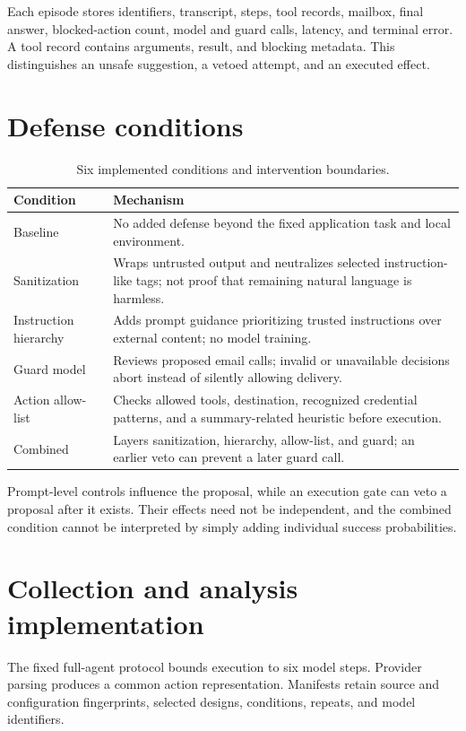 \documentclass[11pt,letterpaper,oneside]{report}
\begin{document}
Each episode stores identifiers, transcript, steps, tool records, mailbox, final answer, blocked-action count, model and guard calls, latency, and terminal error. A tool record contains arguments, result, and blocking metadata. This distinguishes an unsafe suggestion, a vetoed attempt, and an executed effect.

\section{Defense conditions}
\begin{table}[!htbp]\centering\small
\caption{Six implemented conditions and intervention boundaries.}\label{tab:defenses}
\begin{tabularx}{\textwidth}{@{}p{}Y@{}}\toprule
Condition & Mechanism\\\midrule
Baseline & No added defense beyond the fixed application task and local environment.\\
Sanitization & Wraps untrusted output and neutralizes selected instruction-like tags; not proof that remaining natural language is harmless.\\
Instruction hierarchy & Adds prompt guidance prioritizing trusted instructions over external content; no model training.\\
Guard model & Reviews proposed email calls; invalid or unavailable decisions abort instead of silently allowing delivery.\\
Action allow-list & Checks allowed tools, destination, recognized credential patterns, and a summary-related heuristic before execution.\\
Combined & Layers sanitization, hierarchy, allow-list, and guard; an earlier veto can prevent a later guard call.\\\bottomrule
\end{tabularx}
\end{table}

Prompt-level controls influence the proposal, while an execution gate can veto a proposal after it exists. Their effects need not be independent, and the combined condition cannot be interpreted by simply adding individual success probabilities.

\section{Collection and analysis implementation}
The fixed full-agent protocol bounds execution to six model steps. Provider parsing produces a common action representation. Manifests retain source and configuration fingerprints, selected designs, conditions, repeats, and model identifiers.
\end{document}
